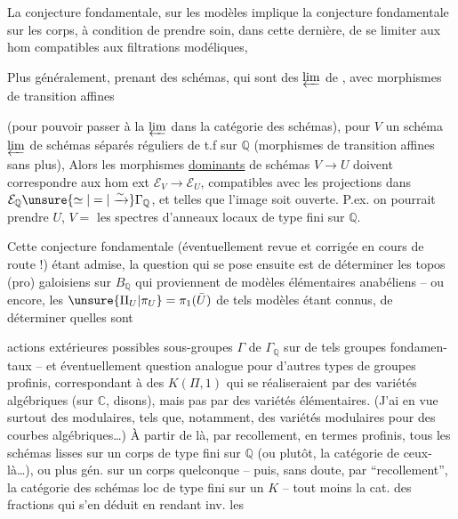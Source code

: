 La conjecture fondamentale, sur les modèles implique la conjecture fondamentale sur les corps, à condition de prendre soin, dans cette dernière, de se limiter aux hom compatibles aux filtrations modéliques,

Plus généralement, prenant  des schémas,  qui sont des $\varprojlim$ de   , avec morphismes de transition  affines

(pour pouvoir passer à la $\varprojlim$ dans la catégorie des schémas), pour $V$ un schéma $\varprojlim$ de schémas séparés réguliers de t.f sur $\mathbb{Q}$ (morphismes de transition  affines sans plus), Alors les morphismes \uline{dominants} de schémas $V\longrightarrow U$ doivent correspondre aux hom ext $\mathcal{E}_V\longrightarrow\mathcal{E}_U$, compatibles avec les projections dans $\mathcal{E}_{\mathbb{Q}}\unsure{\simeq|=|\xrightarrow{\sim}}\Gamma_{\mathbb{Q}}$, et telles que l'image soit ouverte. P.ex. on pourrait prendre  $U$, \unsure{,} $V=$ les spectres d'anneaux locaux  de type fini sur $\mathbb{Q}$.


Cette conjecture fondamentale (éventuellement revue et corrigée en cours de route !) étant admise, la question qui se pose ensuite est de déterminer les topos (pro) galoisiens sur $B_{\mathbb{Q}}$ qui proviennent de modèles élémentaires anabéliens -- ou encore, les $\unsure{\Pi_U|\pi_U}=\pi_1(\bar U)$ de tels modèles étant connus, de déterminer quelles sont

actions extérieures possibles  sous-groupes $\Gamma$ de $\Gamma_{\mathbb{Q}}$ sur de tels groupes fondamen-taux -- et éventuellement question analogue pour d'autres types de groupes profinis, correspondant à des $K(\Pi,1)$ qui se réaliseraient par des variétés algébriques (sur $\mathbb{C}$, disons), mais pas par des variétés élémentaires. (J'ai en vue surtout des   modulaires, tels que, notamment, des variétés modulaires pour des courbes algébriques\ldots) À partir de là,   par recollement, en termes profinis, tous les schémas lisses sur un corps de type fini sur $\mathbb{Q}$ (ou plutôt, la catégorie de ceux-là\ldots), ou plus gén. sur un corps quelconque -- puis, sans doute, par ``recollement'', la catégorie des schémas loc de type fini sur  un $K$ -- tout  moins la cat. des fractions qui s'en déduit en  rendant inv. les

